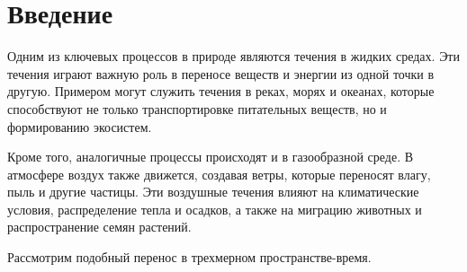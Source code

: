 \section{Введение}
Одним из ключевых процессов в природе являются течения в жидких средах. 
Эти течения играют важную роль в переносе веществ и энергии из одной точки в другую. 
Примером могут служить течения в реках, морях и океанах, 
которые способствуют не только транспортировке питательных веществ, но и формированию экосистем.

Кроме того, аналогичные процессы происходят и в газообразной среде. 
В атмосфере воздух также движется, создавая ветры, которые переносят влагу, пыль и другие частицы. 
Эти воздушные течения влияют на климатические условия, распределение тепла и осадков, 
а также на миграцию животных и распространение семян растений.

Рассмотрим подобный перенос в трехмерном пространстве-время.